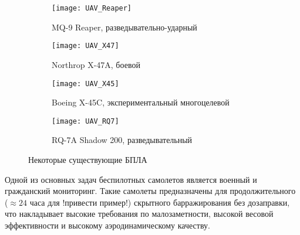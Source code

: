\begin{figure}[H]
        \begin{subfigure}[b]{0.47\textwidth}
                \texttt{[image: UAV\_Reaper]}
                \caption{MQ-9 Reaper, разведывательно-ударный} %
                \label{fig:UAV_Reaper}
        \end{subfigure}%
        \hspace{\fill}
        \begin{subfigure}[b]{0.47\textwidth}
                \texttt{[image: UAV\_X47]}
                \caption{Northrop X-47A, боевой} %
                \label{fig:UAV_X47}
        \end{subfigure}%
        \hspace{\fill}\linebreak
        \begin{subfigure}[b]{0.47\textwidth}
                \texttt{[image: UAV\_X45]}
                \caption{Boeing X-45C, экспериментальный многоцелевой}
                \label{fig:UAV_X45}
        \end{subfigure}%
        \hspace{\fill}
        \begin{subfigure}[b]{0.47\textwidth}
                \texttt{[image: UAV\_RQ7]}
                \caption{RQ-7A Shadow 200, разведывательный}
                \label{fig:UAV_RQ7}
        \end{subfigure}
        \caption{Некоторые существующие БПЛА}\label{fig:UAVs}
\end{figure}








Одной из основных задач беспилотных самолетов является военный и гражданский мониторинг. Такие самолеты предназначены для продолжительного ($\approx24$ часа для !привести пример!) скрытного барражирования без дозаправки, что накладывает высокие требования по малозаметности, высокой весовой эффективности и высокому аэродинамическому качеству.

